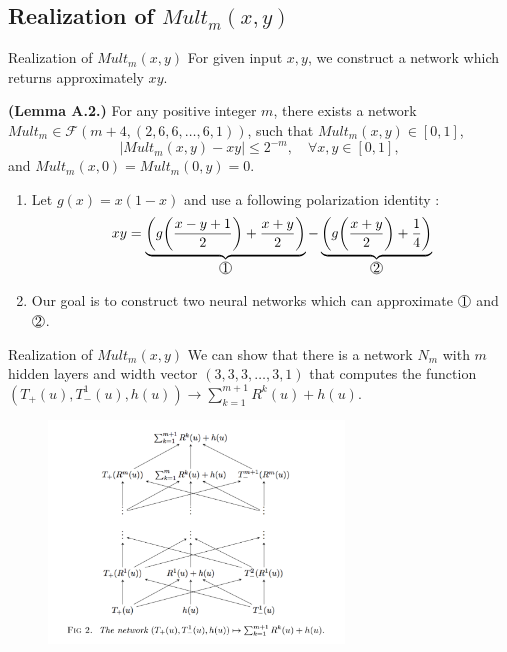 \documentclass{if-beamer}
\newcommand*\circled[1]{\tikz[baseline=(char.base)]{
            \node[shape=circle,draw,inner sep=0.2pt] (char) {#1};}}
\begin{document}
\subsection{Realization of $Mult_{m}(x,y)$}
\begin{frame}{Realization of $Mult_{m}(x,y)$}
    For given input $x,y$, we construct a network which returns 
    approximately $xy$.
    
    \begin{tcolorbox}
    \textbf{(Lemma A.2.)}
    For any positive integer $m$, there exists a network $Mult_m \in \mathcal{F}(m+4,(2,6,6,\dots,6,1))$, such that $Mult_m(x,y)\in[0,1]$,
    \begin{equation*}
        \left|Mult_m(x,y)-xy\right|\leq 2^{-m}, \quad \forall x, y \in [0,1],
    \end{equation*}
    and $Mult_m(x,0)=Mult_m(0,y)=0$.
    \end{tcolorbox}
    \begin{enumerate}
        \item Let $g(x)=x(1-x)$ and use a following polarization identity : 
        \begin{equation*}
            xy = \underbrace{\bigg( g\bigg( \frac{x-y+1}{2} \bigg) + \frac{x+y}{2} \bigg)}_{\circled{1}} - \underbrace{\bigg( g\bigg( \frac{x+y}{2} \bigg) + \frac{1}{4} \bigg)}_{\circled{2}}
        \end{equation*}
        \item Our goal is to construct two neural networks which can approximate $\circled{1}$ and $\circled{2}$. 
    \end{enumerate}

\end{frame}

\begin{frame}{Realization of $Mult_{m}(x,y)$}
    We can show that there is a network $N_m$ with $m$ hidden layers and width vector $(3,3,3,\dots,3,1)$ that computes the function $(T_{+}(u),T_{-}^{1}(u),h(u))\rightarrow{\sum_{k=1}^{m+1}R^{k}(u)+h(u)}$.
    \begin{figure}[htbp]
        \includegraphics[width=0.7\textwidth]{approx_prod.png}
        \label{fig:figure3}
    \end{figure}
\end{frame}
\end{document}

